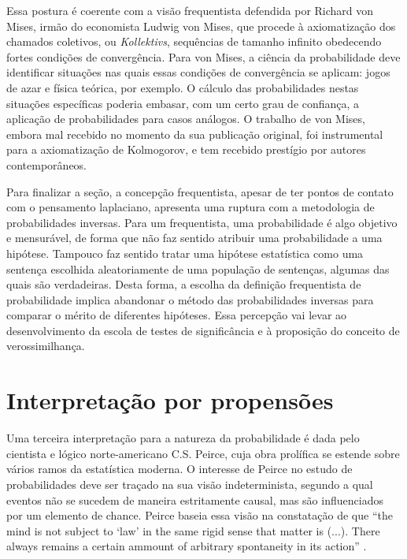 Essa postura é coerente com a visão frequentista defendida por Richard von Mises, 
irmão do economista Ludwig von Mises, que procede à axiomatização dos chamados coletivos, 
ou {\em Kollektivs}, sequências de tamanho infinito
obedecendo fortes condições de convergência\citep{vonMises1941}. 
Para von Mises, a ciência da probabilidade deve identificar situações nas quais essas condições de 
convergência se aplicam: jogos de azar e física teórica, por exemplo. O cálculo das probabilidades nestas
situações específicas poderia embasar, com um certo grau de confiança, a aplicação de probabilidades para
casos análogos. O trabalho de von Mises, embora mal recebido no momento da sua publicação original, foi 
instrumental para a axiomatização de Kolmogorov\citep{Shafer03}, e tem recebido prestígio por autores 
contemporâneos.

Para finalizar a seção, 
a concepção frequentista, apesar de ter pontos de contato com o pensamento laplaciano, apresenta
uma ruptura com a metodologia de probabilidades inversas. Para um frequentista, uma probabilidade é algo objetivo
e mensurável, de forma que não faz sentido atribuir uma probabilidade a uma hipótese. 
Tampouco faz sentido tratar uma hipótese estatística como uma sentença escolhida aleatoriamente 
de uma população de sentenças, algumas das quais são verdadeiras.
Desta forma, a escolha da definição frequentista de probabilidade implica abandonar o método
das probabilidades inversas para comparar o mérito de diferentes hipóteses.
Essa percepção vai levar ao desenvolvimento da escola de testes de significância e à 
proposição do conceito de verossimilhança.

\section{Interpretação por propensões}

Uma terceira interpretação para a natureza da probabilidade é dada pelo cientista e lógico norte-americano 
C.S. Peirce,
cuja obra prolífica se estende sobre vários ramos da estatística moderna. 
O interesse de Peirce no estudo de probabilidades
deve ser traçado na sua visão indeterminista, segundo a qual eventos não 
se sucedem de maneira estritamente causal, mas são
influenciados por um elemento de chance. Peirce baseia essa visão 
na constatação de que ``the mind is not subject to `law'
in the same rigid sense that matter is (...). There always remains 
a certain ammount of arbitrary spontaneity in its action''
\citep{Peirce1892}. 

